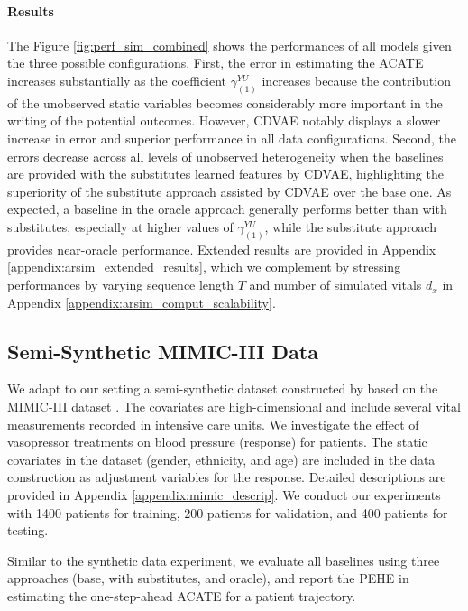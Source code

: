 \documentclass[10pt]{article} %
\begin{document}
\paragraph{Results} The Figure \ref{fig:perf_sim_combined} shows the performances of all models given the three possible configurations. First, the error in estimating the ACATE increases substantially as the coefficient \(\gamma_{(1)}^{YU}\) increases because the contribution of the unobserved static variables becomes considerably more important in the writing of the potential outcomes. However, CDVAE notably displays a slower increase in error and superior performance in all data configurations. Second, the errors decrease across all levels of unobserved heterogeneity when the baselines are provided with the substitutes learned features by CDVAE, highlighting the superiority of the substitute approach assisted by CDVAE over the base one. As expected, a baseline in the oracle approach generally performs better than with substitutes, especially at higher values of \(\gamma_{(1)}^{YU}\), while the substitute approach provides near-oracle performance. Extended results are provided in Appendix \ref{appendix:arsim_extended_results}, which we complement by stressing performances by varying sequence length $T$ and number of simulated vitals $d_x$ in Appendix \ref{appendix:arsim_comput_scalability}.


\subsection{Semi-Synthetic MIMIC-III Data}  
We adapt to our setting a semi-synthetic dataset constructed by \cite{Melnychuk2022CausalTF} based on the MIMIC-III dataset \citep{johnson2016mimic}. The covariates are high-dimensional and include several vital measurements recorded in intensive care units. We investigate the effect of vasopressor treatments on blood pressure (response) for patients. The static covariates in the dataset (gender, ethnicity, and age) are included in the data construction as adjustment variables for the response. Detailed descriptions are provided in Appendix \ref{appendix:mimic_descrip}. We conduct our experiments with 1400 patients for training, 200 patients for validation, and 400 patients for testing.

Similar to the synthetic data experiment, we evaluate all baselines using three approaches (base, with substitutes, and oracle), and report the PEHE in estimating the one-step-ahead ACATE for a patient trajectory.
\end{document}
